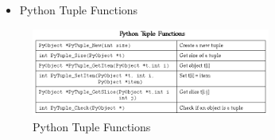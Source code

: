  \begin{itemize}
 	\item Python Tuple Functions
 \end{itemize}
 
 \begin{figure}[ht]
 	\centerline{\includegraphics[width=0.70\textwidth]{figures/Functions1}}
 	\caption{Python Tuple Functions}
 	\label{Python Tuple Functions}
 \end{figure} 

